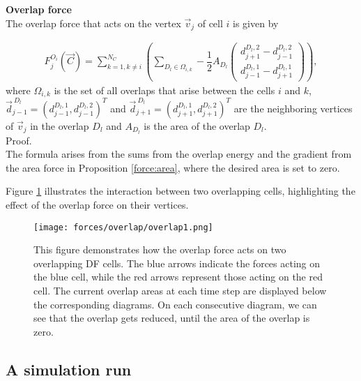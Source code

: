 \begin{proposition} \textbf{Overlap force} \\
	The overlap force that acts on the vertex $\vec{v}_j$ of cell $i$ is given by 

	\begin{align}
		F_j^{O_i}(\vec{C}) = \sum\limits_{k=1, k \neq i}^{N_C} \left( \sum\limits_{D_l \in \Omega_{i,k}} -\dfrac{1}{2} A_{D_l} \begin{pmatrix} d_{j+1}^{D_l, 2} - d_{j-1}^{D_l, 2} \\[0.5em]  d_{j-1}^{D_l, 1} - d_{j+1}^{D_l, 1} \end{pmatrix} \right),
	\end{align}
	where $\Omega_{i,k}$ is the set of all overlaps that arise between the cells $i$ and $k$, $\vec{d}_{j-1}^{\: D_l} = (d_{j-1}^{D_l, 1}, d_{j-1}^{D_l, 2})^T$ and $\vec{d}_{j+1}^{\: D_l} = (d_{j+1}^{D_l, 1}, d_{j+1}^{D_l, 2})^T$ are the neighboring vertices of $\vec{v}_j$ in the overlap $D_l$ and $A_{D_l}$ is the area of the overlap $D_l$. \\

	Proof. \\
	The formula arises from the sums from the overlap energy and the gradient from the area force in Proposition \ref{force:area}, where the desired area is set to zero. 
\end{proposition}

Figure \ref{fig:overlapForce} illustrates the interaction between two overlapping cells, highlighting the effect of the overlap force on their vertices.
\begin{figure}[h!]
	\begin{center}
		\texttt{[image: forces/overlap/overlap1.png]}
			\caption{This figure demonstrates how the overlap force acts on two overlapping DF cells.
			The blue arrows indicate the forces acting on the blue cell, while the red arrows represent those acting on the red cell.
			The current overlap areas at each time step are displayed below the corresponding diagrams.			
			On each consecutive diagram, we can see that the overlap gets reduced, until the area of the overlap is zero.  }
			\label{fig:overlapForce}
	\end{center}
\end{figure}


\subsection{A simulation run}
